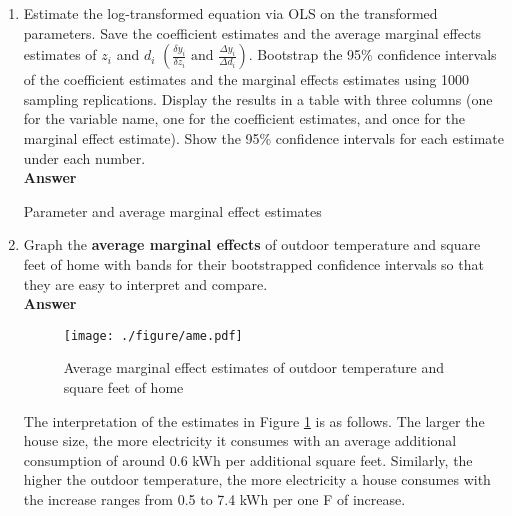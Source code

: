 \documentclass{article}
\begin{document}
\begin{enumerate}
\begin{enumerate}
    \item Estimate the log-transformed equation via OLS on the transformed parameters. Save the coefficient estimates and the average marginal effects estimates of $z_i$ and $d_i$ $\left(\frac{\delta y_i}{\delta z_i}\text{ and }\frac{\Delta y_i}{\Delta d_i}\right)$. Bootstrap the 95\% confidence intervals of the coefficient estimates and the marginal effects estimates using 1000 sampling replications. Display the results in a table with three columns (one for the variable name, one for the coefficient estimates, and once for the marginal effect estimate). Show the 95\% confidence intervals for each estimate under each number.
    \\\textbf{Answer}\\
    \begin{table}[H]\centering
        \begin{threeparttable}
            \caption{Parameter and average marginal effect estimates}
            \label{t1:estimates}
            
        \end{threeparttable}
        \end{table}
    \item Graph the \textbf{average marginal effects} of outdoor temperature and square feet of home with bands for their bootstrapped confidence intervals so that they are easy to interpret and compare.
    \\\textbf{Answer}\\
    \begin{figure}[H]
        \centering
        \texttt{[image: ./figure/ame.pdf]}
        \caption{Average marginal effect estimates of outdoor temperature and square feet of home}
        \label{f1:ame}
    \end{figure}
    The interpretation of the estimates in Figure \ref{f1:ame} is as follows. The larger the house size, the more electricity it consumes with an average additional consumption of around 0.6 kWh per additional square feet. Similarly, the higher the outdoor temperature, the more electricity a house consumes with the increase ranges from 0.5 to 7.4 kWh per one \textdegree F of increase.
\end{enumerate}


\end{enumerate}
\end{document}
